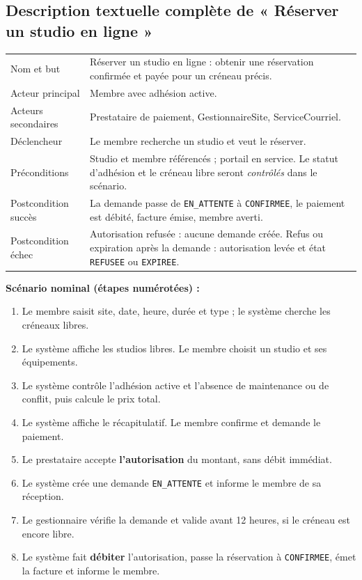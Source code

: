 \documentclass[10pt,a4paper]{article}
\begin{document}
\subsection{Description textuelle complète de « Réserver un studio en ligne »}
\begin{tabularx}{\linewidth}{@{}p{37mm}X@{}}
\toprule
Nom et but & Réserver un studio en ligne : obtenir une réservation confirmée et payée pour un créneau précis.\\
Acteur principal & Membre avec adhésion active.\\
Acteurs secondaires & Prestataire de paiement, GestionnaireSite, ServiceCourriel.\\
Déclencheur & Le membre recherche un studio et veut le réserver.\\
Préconditions & Studio et membre référencés ; portail en service. Le statut d'adhésion et le créneau libre seront \emph{contrôlés} dans le scénario.\\
Postcondition succès & La demande passe de \texttt{EN\_ATTENTE} à \texttt{CONFIRMEE}, le paiement est débité, facture émise, membre averti.\\
Postcondition échec & Autorisation refusée : aucune demande créée. Refus ou expiration après la demande : autorisation levée et état \texttt{REFUSEE} ou \texttt{EXPIREE}.\\
\bottomrule
\end{tabularx}
\textbf{Scénario nominal (étapes numérotées) :}
\begin{enumerate}
\item Le membre saisit site, date, heure, durée et type ; le système cherche les créneaux libres.
\item Le système affiche les studios libres. Le membre choisit un studio et ses équipements.
\item Le système contrôle l'adhésion active et l'absence de maintenance ou de conflit, puis calcule le prix total.
\item Le système affiche le récapitulatif. Le membre confirme et demande le paiement.
\item Le prestataire accepte \textbf{l'autorisation} du montant, sans débit immédiat.
\item Le système crée une demande \texttt{EN\_ATTENTE} et informe le membre de sa réception.
\item Le gestionnaire vérifie la demande et valide avant 12 heures, si le créneau est encore libre.
\item Le système fait \textbf{débiter} l'autorisation, passe la réservation à \texttt{CONFIRMEE}, émet la facture et informe le membre.
\end{enumerate}
\end{document}
